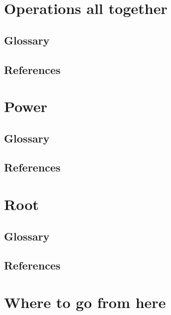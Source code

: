 \documentclass{report}
\begin{document}
\chapter{Operations all together}%
\section{Glossary}
\section{References}
\pagebreak


\chapter{Power}%
\section{Glossary}
\section{References}
\pagebreak

\chapter{Root}%
\section{Glossary}
\section{References}
\pagebreak

\chapter{Where to go from here}
\pagebreak
\end{document}
